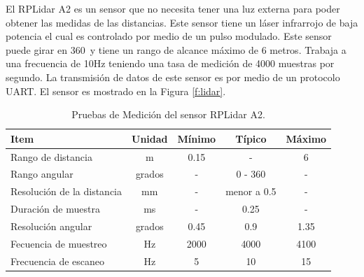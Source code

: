 
El RPLidar A2 es un sensor que no necesita tener una luz externa para poder obtener las
medidas de las distancias. Este sensor tiene un láser infrarrojo de baja potencia el cual
es controlado por medio de un pulso modulado. Este sensor puede girar en 360\grad ~y tiene
un rango de alcance máximo de 6 metros. Trabaja a una frecuencia de 10Hz teniendo una tasa 
de medición de 4000 muestras por segundo. La transmisión de datos de este sensor es por 
medio de un protocolo UART. El sensor es mostrado en la Figura \ref{f:lidar}.




\begin{table}[htbp]
\begin{center}
\begin{tabular}{|l|c|c|c|c|}
	\hline
	Item & Unidad & M\'inimo & T\'ipico & M\'aximo\\
	\hline \hline
	Rango de distancia & m & 0.15 & - & 6 \\ \hline
	Rango angular & grados & - & 0 - 360 & - \\ \hline
	Resoluci\'on de la distancia & mm & - & menor a 0.5 & - \\ \hline
	Duraci\'on de muestra & ms & - & 0.25 & - \\ \hline
	Resoluci\'on angular & grados & 0.45 & 0.9 & 1.35 \\ \hline
	Fecuencia de muestreo & Hz & 2000 & 4000 & 4100 \\ \hline
	Frecuencia de escaneo & Hz & 5 & 10 & 15 \\ \hline
\end{tabular}
	\caption{Pruebas de Medici\'on del sensor RPLidar A2.}
	\label{tbl:medicion}
\end{center}
\end{table}

